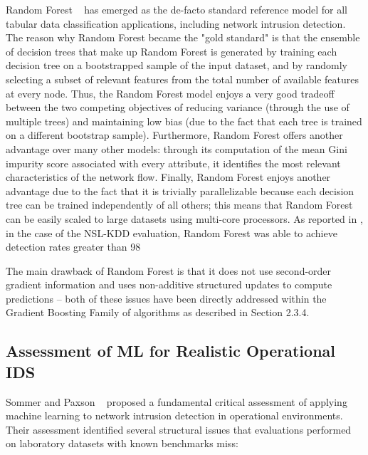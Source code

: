 Random Forest ~\cite{tavallaee2009nslkdd} has emerged as the de-facto standard reference model for all tabular data classification applications, including network intrusion detection. The reason why Random Forest became the "gold standard" is that the ensemble of decision trees that make up Random Forest is generated by training each decision tree on a bootstrapped sample of the input dataset, and by randomly selecting a subset of relevant features from the total number of available features at every node. Thus, the Random Forest model enjoys a very good tradeoff between the two competing objectives of reducing variance (through the use of multiple trees) and maintaining low bias (due to the fact that each tree is trained on a different bootstrap sample). Furthermore, Random Forest offers another advantage over many other models: through its computation of the mean Gini impurity score associated with every attribute, it identifies the most relevant characteristics of the network flow. Finally, Random Forest enjoys another advantage due to the fact that it is trivially parallelizable because each decision tree can be trained independently of all others; this means that Random Forest can be easily scaled to large datasets using multi-core processors. As reported in \cite{tavallaee2009nslkdd}, in the case of the NSL-KDD evaluation, Random Forest was able to achieve detection rates greater than 98 %

The main drawback of Random Forest is that it does not use second-order gradient information and uses non-additive structured updates to compute predictions -- both of these issues have been directly addressed within the Gradient Boosting Family of algorithms as described in Section 2.3.4.

\subsection{Assessment of ML for Realistic Operational IDS}

Sommer and Paxson ~\cite{sommer2010outside} proposed a fundamental critical assessment of applying machine learning to network intrusion detection in operational environments. Their assessment identified several structural issues that evaluations performed on laboratory datasets with known benchmarks miss:

